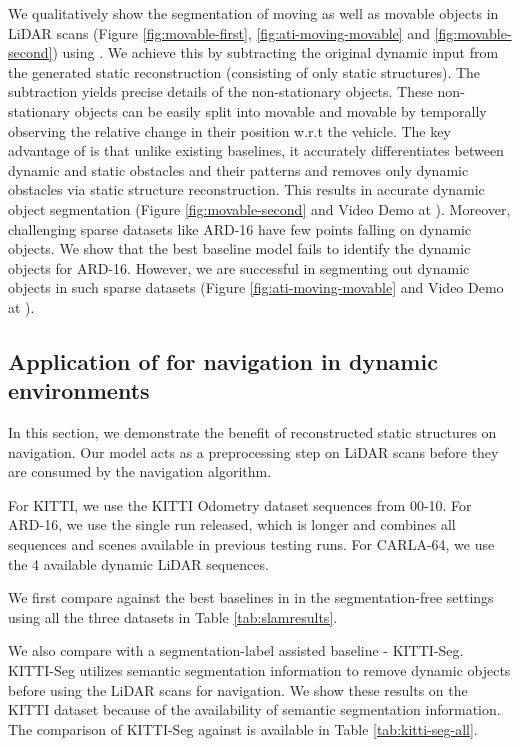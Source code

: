 We qualitatively show the segmentation of moving as well as movable objects in LiDAR scans (Figure \ref{fig:movable-first}, \ref{fig:ati-moving-movable} and \ref{fig:movable-second}) using \dslr{}. We achieve this by subtracting the original dynamic input from the generated static reconstruction (consisting of only static structures). The subtraction yields precise details of the non-stationary objects. These non-stationary objects can be
easily split into movable and movable by temporally observing the relative change in their position w.r.t the vehicle. The key advantage of \dslr{} is that unlike existing baselines, it accurately differentiates between dynamic and static obstacles and their patterns and removes only dynamic obstacles via static structure reconstruction. This results in accurate dynamic object segmentation (Figure \ref{fig:movable-second} and Video Demo at \cite{url3}). 
Moreover, challenging sparse datasets like ARD-16 have few points falling on dynamic objects. We show that the best baseline model fails to identify the dynamic objects for ARD-16. However, we are successful in segmenting out dynamic objects in such sparse datasets (Figure \ref{fig:ati-moving-movable} and Video Demo at \cite{url2}).





\subsection{Application of \dslr{} for navigation in dynamic environments}
In this section, we demonstrate the benefit of reconstructed static structures on navigation. Our model acts as a preprocessing step on LiDAR scans before they are consumed by the  navigation algorithm.

For KITTI, we use the KITTI Odometry dataset sequences from 00-10. For ARD-16, we use the single run released, which is longer and combines all sequences and scenes available in previous testing runs.  For CARLA-64, we use the 4 available dynamic LiDAR sequences.

We first compare \dslr{} against the best baselines in in the segmentation-free settings using all the three datasets in Table \ref{tab:slamresults}.

We also compare \dslruda{} with a segmentation-label assisted baseline - KITTI-Seg. KITTI-Seg utilizes semantic segmentation information to remove dynamic objects before using the LiDAR scans for navigation. We show these results on the KITTI dataset because of the availability of semantic segmentation information. The comparison of KITTI-Seg against \dslruda{} is available in Table \ref{tab:kitti-seg-all}.

